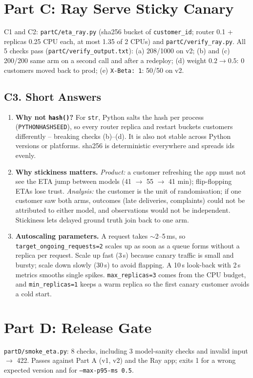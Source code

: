 \documentclass[10pt]{article}
\newcommand{\code}[1]{\texttt{#1}}
\begin{document}
\section{Part C: Ray Serve Sticky Canary}

C1 and C2: \code{partC/eta\_ray.py} (sha256 bucket of \code{customer\_id}; router 0.1 + replicas 0.25 CPU each, at most
1.35 of 2 CPUs) and \code{partC/verify\_ray.py}. All 5 checks pass (\code{partC/verify\_output.txt}): (a) 208/1000 on v2;
(b) and (c) 200/200 same arm on a second call and after a redeploy; (d) weight $0.2\to0.5$: 0 customers moved back to prod;
(e) \code{X-Beta: 1}: 50/50 on v2.

\subsection{C3. Short Answers}
\begin{enumerate}
  \item \textbf{Why not \code{hash()}?} For \code{str}, Python salts the hash per process (\code{PYTHONHASHSEED}), so every router replica and restart
  buckets customers differently -- breaking checks (b)--(d). It is also not stable across Python versions or platforms. sha256 is deterministic
  everywhere and spreads ids evenly.
  \item \textbf{Why stickiness matters.} \emph{Product:} a customer refreshing the app must not see the ETA jump between models (41 $\to$ 55 $\to$ 41 min);
  flip-flopping ETAs lose trust. \emph{Analysis:} the customer is the unit of randomisation; if one customer saw both arms, outcomes (late deliveries,
  complaints) could not be attributed to either model, and observations would not be independent. Stickiness lets delayed ground truth join back to one arm.
  \item \textbf{Autoscaling parameters.} A request takes $\sim$2--5\,ms, so \code{target\_ongoing\_requests=2} scales up as soon as a queue forms without a
  replica per request. Scale up fast (3\,s) because canary traffic is small and bursty; scale down slowly (30\,s) to avoid flapping. A 10\,s look-back with
  2\,s metrics smooths single spikes. \code{max\_replicas=3} comes from the CPU budget, and \code{min\_replicas=1} keeps a warm replica so the first canary
  customer avoids a cold start.
\end{enumerate}

\section{Part D: Release Gate}
\code{partD/smoke\_eta.py}: 8 checks, including 3 model-sanity checks and invalid input $\to$ 422. Passes against Part A (v1, v2)
and the Ray app; exits 1 for a wrong expected version and for \code{--max-p95-ms 0.5}.
\end{document}
